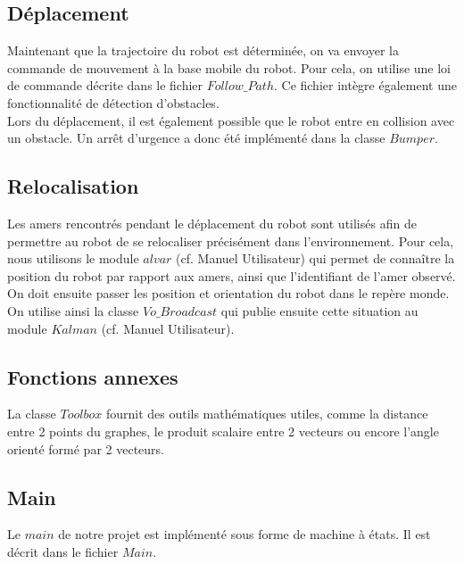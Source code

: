 \documentclass[10pt,a4paper]{article}
\begin{document}
\subsection{Déplacement}
\label{sec:deplacement}

Maintenant que la trajectoire du robot est déterminée, on va envoyer la commande de mouvement à la base mobile du robot. Pour cela, on utilise une loi de commande décrite dans le fichier $Follow\_Path$. Ce fichier intègre également une fonctionnalité de détection d'obstacles.\\
Lors du déplacement, il est également possible que le robot entre en collision avec un obstacle. Un arrêt d'urgence a donc été implémenté dans la classe $Bumper$.


\subsection{Relocalisation}
\label{sec:relocalisation}

Les amers rencontrés pendant le déplacement du robot sont utilisés afin de permettre au robot de se relocaliser précisément dans l'environnement. Pour cela, nous utilisons le module $alvar$ (cf. Manuel Utilisateur) qui permet de connaître la position du robot par rapport aux amers, ainsi que l'identifiant de l'amer observé. On doit ensuite passer les position et orientation du robot dans le repère monde. On utilise ainsi la classe $Vo\_Broadcast$ qui publie ensuite cette situation au module $Kalman$ (cf. Manuel Utilisateur).


\subsection{Fonctions annexes}
\label{sec:fonctions_annexes}

La classe $Toolbox$ fournit des outils mathématiques utiles, comme la distance entre 2 points du graphes, le produit scalaire entre 2 vecteurs ou encore l'angle orienté formé par 2 vecteurs.


\subsection{Main}
\label{sec:main}

Le $main$ de notre projet est implémenté sous forme de machine à états. Il est décrit dans le fichier $Main$.
\end{document}
